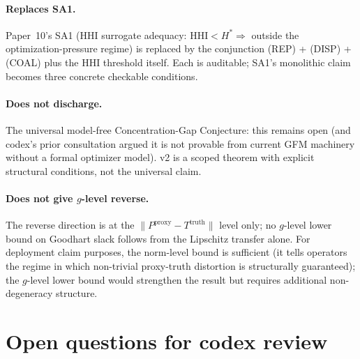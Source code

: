 \documentclass{article}
\newcommand{\HHI}{\mathrm{HHI}}
\newcommand{\Pproxy}{P^{\mathrm{proxy}}}
\newcommand{\Ttruth}{T^{\mathrm{truth}}}
\begin{document}
\paragraph{Replaces SA1.} Paper~10's SA1 (HHI surrogate adequacy:
$\HHI < H^* \Rightarrow$ outside the optimization-pressure regime)
is replaced by the conjunction (REP) + (DISP) + (COAL) plus the
HHI threshold itself.  Each is auditable; SA1's monolithic claim
becomes three concrete checkable conditions.

\paragraph{Does not discharge.} The universal model-free
Concentration-Gap Conjecture: this remains open (and codex's prior
consultation argued it is not provable from current GFM machinery
without a formal optimizer model).  v2 is a scoped theorem with
explicit structural conditions, not the universal claim.

\paragraph{Does not give $g$-level reverse.} The reverse direction
is at the $\|\Pproxy - \Ttruth\|$ level only; no $g$-level lower
bound on Goodhart slack follows from the Lipschitz transfer alone.
For deployment claim purposes, the norm-level bound is sufficient
(it tells operators the regime in which non-trivial proxy-truth
distortion is structurally guaranteed); the $g$-level lower
bound would strengthen the result but requires additional
non-degeneracy structure.

\section{Open questions for codex review}
\end{document}
